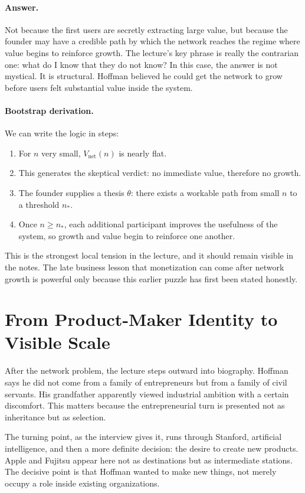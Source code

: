 \paragraph{Answer.}
Not because the first users are secretly extracting large value, but because the founder may have a credible path by which the network reaches the regime where value begins to reinforce growth. The lecture's key phrase is really the contrarian one: what do I know that they do not know? In this case, the answer is not mystical. It is structural. Hoffman believed he could get the network to grow before users felt substantial value inside the system.

\paragraph{Bootstrap derivation.}
We can write the logic in steps:
\begin{enumerate}
\item For \(n\) very small, \(V_{\mathrm{net}}(n)\) is nearly flat.
\item This generates the skeptical verdict: no immediate value, therefore no growth.
\item The founder supplies a thesis \(\theta\): there exists a workable path from small \(n\) to a threshold \(n_\ast\).
\item Once \(n\geq n_\ast\), each additional participant improves the usefulness of the system, so growth and value begin to reinforce one another.
\end{enumerate}

This is the strongest local tension in the lecture, and it should remain visible in the notes. The late business lesson that monetization can come after network growth is powerful only because this earlier puzzle has first been stated honestly.

\section{From Product-Maker Identity to Visible Scale}

After the network problem, the lecture steps outward into biography. Hoffman says he did not come from a family of entrepreneurs but from a family of civil servants. His grandfather apparently viewed industrial ambition with a certain discomfort. This matters because the entrepreneurial turn is presented not as inheritance but as selection.

The turning point, as the interview gives it, runs through Stanford, artificial intelligence, and then a more definite decision: the desire to create new products. Apple and Fujitsu appear here not as destinations but as intermediate stations. The decisive point is that Hoffman wanted to make new things, not merely occupy a role inside existing organizations.

